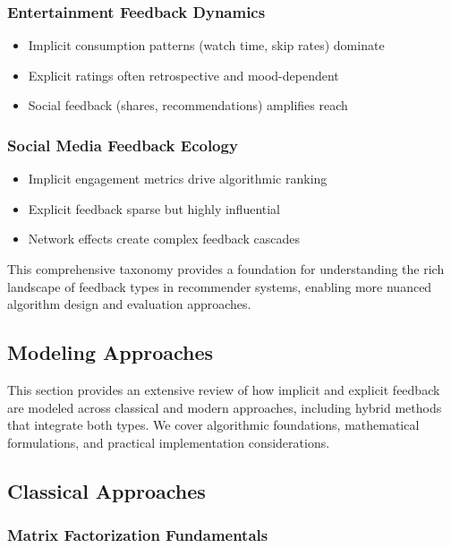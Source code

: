 \subsubsection{Entertainment Feedback Dynamics}
\begin{itemize}
    \item Implicit consumption patterns (watch time, skip rates) dominate
    \item Explicit ratings often retrospective and mood-dependent
    \item Social feedback (shares, recommendations) amplifies reach
\end{itemize}

\subsubsection{Social Media Feedback Ecology}
\begin{itemize}
    \item Implicit engagement metrics drive algorithmic ranking
    \item Explicit feedback sparse but highly influential
    \item Network effects create complex feedback cascades
\end{itemize}

This comprehensive taxonomy provides a foundation for understanding the rich landscape of feedback types in recommender systems, enabling more nuanced algorithm design and evaluation approaches.

\subsection{Modeling Approaches}
\label{subsec:modeling}

This section provides an extensive review of how implicit and explicit feedback are modeled across classical and modern approaches, including hybrid methods that integrate both types. We cover algorithmic foundations, mathematical formulations, and practical implementation considerations.

\subsection{Classical Approaches}

\subsubsection{Matrix Factorization Fundamentals}

